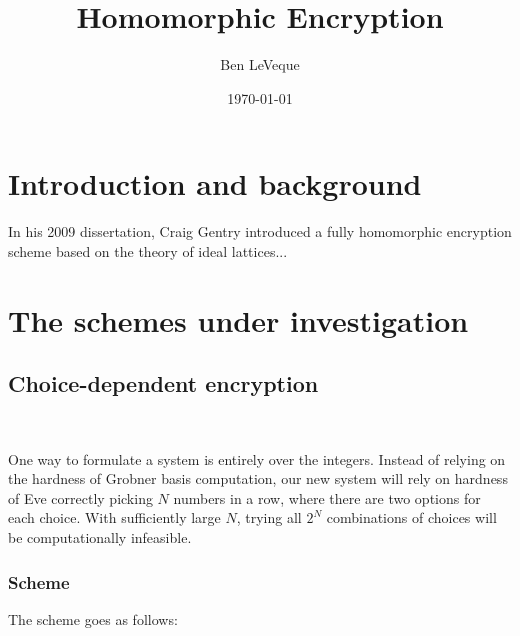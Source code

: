\documentclass[11pt]{report}
\title{Homomorphic Encryption}
\author{Ben LeVeque}
\date{\today}
\begin{document}
\maketitle



\section[Intro]{Introduction and background}
In his 2009 dissertation, Craig Gentry introduced a fully homomorphic encryption scheme based on the theory of ideal lattices...

\section[Schemes]{The schemes under investigation}
\subsection{Choice-dependent encryption}

\

One way to formulate a system is entirely over the integers. Instead of relying on the hardness of Grobner basis computation, our new system will rely on hardness of Eve correctly picking $N$ numbers in a row, where there are two options for each choice. With sufficiently large $N$, trying all $2^N$ combinations of choices will be computationally infeasible.

\subsubsection{Scheme}

The scheme goes as follows:
\end{document}

